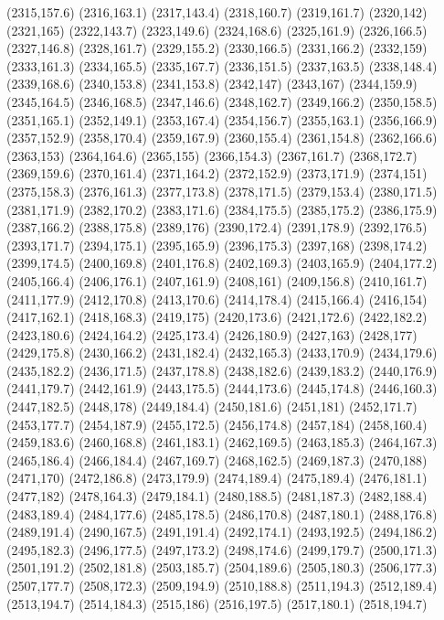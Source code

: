 (2315,157.6)
(2316,163.1)
(2317,143.4)
(2318,160.7)
(2319,161.7)
(2320,142)
(2321,165)
(2322,143.7)
(2323,149.6)
(2324,168.6)
(2325,161.9)
(2326,166.5)
(2327,146.8)
(2328,161.7)
(2329,155.2)
(2330,166.5)
(2331,166.2)
(2332,159)
(2333,161.3)
(2334,165.5)
(2335,167.7)
(2336,151.5)
(2337,163.5)
(2338,148.4)
(2339,168.6)
(2340,153.8)
(2341,153.8)
(2342,147)
(2343,167)
(2344,159.9)
(2345,164.5)
(2346,168.5)
(2347,146.6)
(2348,162.7)
(2349,166.2)
(2350,158.5)
(2351,165.1)
(2352,149.1)
(2353,167.4)
(2354,156.7)
(2355,163.1)
(2356,166.9)
(2357,152.9)
(2358,170.4)
(2359,167.9)
(2360,155.4)
(2361,154.8)
(2362,166.6)
(2363,153)
(2364,164.6)
(2365,155)
(2366,154.3)
(2367,161.7)
(2368,172.7)
(2369,159.6)
(2370,161.4)
(2371,164.2)
(2372,152.9)
(2373,171.9)
(2374,151)
(2375,158.3)
(2376,161.3)
(2377,173.8)
(2378,171.5)
(2379,153.4)
(2380,171.5)
(2381,171.9)
(2382,170.2)
(2383,171.6)
(2384,175.5)
(2385,175.2)
(2386,175.9)
(2387,166.2)
(2388,175.8)
(2389,176)
(2390,172.4)
(2391,178.9)
(2392,176.5)
(2393,171.7)
(2394,175.1)
(2395,165.9)
(2396,175.3)
(2397,168)
(2398,174.2)
(2399,174.5)
(2400,169.8)
(2401,176.8)
(2402,169.3)
(2403,165.9)
(2404,177.2)
(2405,166.4)
(2406,176.1)
(2407,161.9)
(2408,161)
(2409,156.8)
(2410,161.7)
(2411,177.9)
(2412,170.8)
(2413,170.6)
(2414,178.4)
(2415,166.4)
(2416,154)
(2417,162.1)
(2418,168.3)
(2419,175)
(2420,173.6)
(2421,172.6)
(2422,182.2)
(2423,180.6)
(2424,164.2)
(2425,173.4)
(2426,180.9)
(2427,163)
(2428,177)
(2429,175.8)
(2430,166.2)
(2431,182.4)
(2432,165.3)
(2433,170.9)
(2434,179.6)
(2435,182.2)
(2436,171.5)
(2437,178.8)
(2438,182.6)
(2439,183.2)
(2440,176.9)
(2441,179.7)
(2442,161.9)
(2443,175.5)
(2444,173.6)
(2445,174.8)
(2446,160.3)
(2447,182.5)
(2448,178)
(2449,184.4)
(2450,181.6)
(2451,181)
(2452,171.7)
(2453,177.7)
(2454,187.9)
(2455,172.5)
(2456,174.8)
(2457,184)
(2458,160.4)
(2459,183.6)
(2460,168.8)
(2461,183.1)
(2462,169.5)
(2463,185.3)
(2464,167.3)
(2465,186.4)
(2466,184.4)
(2467,169.7)
(2468,162.5)
(2469,187.3)
(2470,188)
(2471,170)
(2472,186.8)
(2473,179.9)
(2474,189.4)
(2475,189.4)
(2476,181.1)
(2477,182)
(2478,164.3)
(2479,184.1)
(2480,188.5)
(2481,187.3)
(2482,188.4)
(2483,189.4)
(2484,177.6)
(2485,178.5)
(2486,170.8)
(2487,180.1)
(2488,176.8)
(2489,191.4)
(2490,167.5)
(2491,191.4)
(2492,174.1)
(2493,192.5)
(2494,186.2)
(2495,182.3)
(2496,177.5)
(2497,173.2)
(2498,174.6)
(2499,179.7)
(2500,171.3)
(2501,191.2)
(2502,181.8)
(2503,185.7)
(2504,189.6)
(2505,180.3)
(2506,177.3)
(2507,177.7)
(2508,172.3)
(2509,194.9)
(2510,188.8)
(2511,194.3)
(2512,189.4)
(2513,194.7)
(2514,184.3)
(2515,186)
(2516,197.5)
(2517,180.1)
(2518,194.7)
